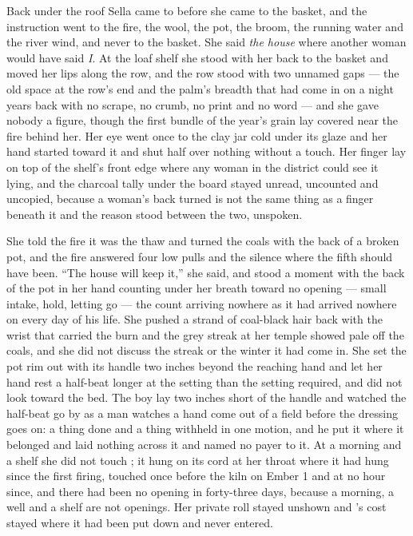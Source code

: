 \scenebreak

Back under the roof Sella came to  before she came to the basket, and the instruction went to the fire, the wool, the pot, the broom, the running water and the river wind, and never to the basket. She said \emph{the house} where another woman would have said \emph{I}. At the loaf shelf she stood with her back to the basket and moved her lips along the row, and the row stood with two unnamed gaps --- the old space at the row's end and the palm's breadth that had come in on a night years back with no scrape, no crumb, no print and no word --- and she gave nobody a figure, though the first bundle of the year's grain lay covered near the fire behind her. Her eye went once to the clay jar cold under its glaze and her hand started toward it and shut half over nothing without a touch. Her finger lay on top of the shelf's front edge where any woman in the district could see it lying, and the charcoal tally under the board stayed unread, uncounted and uncopied, because a woman's back turned is not the same thing as a finger beneath it and the reason stood between the two, unspoken.

She told the fire it was the thaw and turned the coals with the back of a broken pot, and the fire answered four low pulls and the silence where the fifth should have been. “The house will keep it,” she said, and stood a moment with the back of the pot in her hand counting under her breath toward no opening --- small intake, hold, letting go --- the count arriving nowhere as it had arrived nowhere on every day of his life. She pushed a strand of coal-black hair back with the wrist that carried the burn and the grey streak at her temple showed pale off the coals, and she did not discuss the streak or the winter it had come in. She set the pot rim out with its handle two inches beyond the reaching hand and let her hand rest a half-beat longer at the setting than the setting required, and did not look toward the bed. The boy lay two inches short of the handle and watched the half-beat go by as a man watches a hand come out of a field before the dressing goes on: a thing done and a thing withheld in one motion, and he put it where it belonged and laid nothing across it and named no payer to it. At a morning and a shelf she did not touch ; it hung on its cord at her throat where it had hung since the first firing, touched once before the kiln on Ember 1 and at no hour since, and there had been no opening in forty-three days, because a morning, a well and a shelf are not openings. Her private roll stayed unshown and 's cost stayed where it had been put down and never entered.

